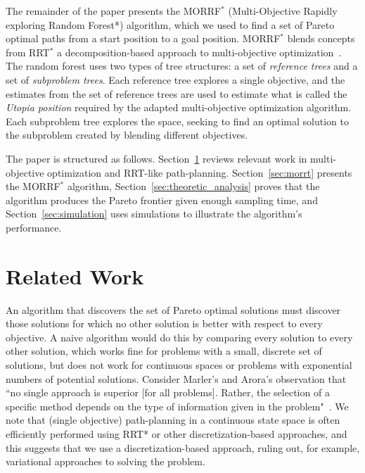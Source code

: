 \documentclass[conference]{IEEEtran}
\begin{document}
The remainder of the paper presents the MORRF$^{*}$ (Multi-Objective Rapidly exploring Random Forest*) algorithm, which we used to find a set of Pareto optimal paths from a start position to a goal position.  
MORRF$^{*}$ blends concepts from RRT$^{*}$ a decomposition-based approach to multi-objective optimization~\cite{4358754}.  
The random forest uses two types of tree structures: a set of {\em reference trees} and a set of {\em subproblem trees}.  
Each reference tree explores a single objective, and the estimates from the set of reference trees are used to estimate what is called the {\em Utopia position} required by the adapted multi-objective optimization algorithm.  
Each subproblem tree explores the space, seeking to find an optimal solution to the subproblem created by blending different objectives. 

The paper is structured as follows.  
Section~\ref{sec:related_works} reviews relevant work in multi-objective optimization and RRT-like path-planning. 
Section~\ref{sec:morrt} presents the MORRF$^{*}$ algorithm,  
Section~\ref{sec:theoretic_analysis} proves that the algorithm produces the Pareto frontier given enough sampling time, 
and Section~\ref{sec:simulation} uses simulations to illustrate the algorithm's performance.

\section{Related Work}
\label{sec:related_works}

An algorithm that discovers the set of Pareto optimal solutions must discover those solutions for which no other solution is better with respect to every objective.  A naive algorithm would do this by comparing every solution to every other solution, which works fine for problems with a small, discrete set of solutions, but does not work for continuous spaces or problems with exponential numbers of potential solutions.  
Consider Marler's and Arora's observation that ``no single approach is superior [for all problems].  
Rather, the selection of a specific method depends on the type of information given in the problem"~\cite{marler2004survey}.  
We note that (single objective) path-planning in a continuous state space is often efficiently performed using RRT* or other discretization-based approaches, and this suggests that we use a discretization-based approach, ruling out, for example, variational approaches to solving the problem.    
\end{document}
